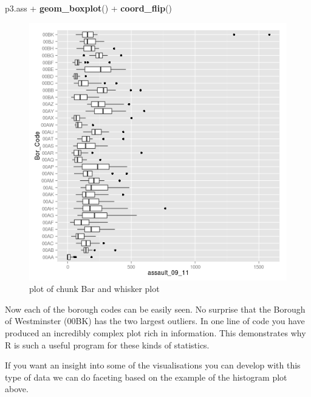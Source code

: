 \documentclass[]{article}
\makeatletter
\newenvironment{Shaded}{}{}
\newcommand{\KeywordTok}[1]{\textcolor[rgb]{0.00,0.44,0.13}{\textbf{{#1}}}}
\newcommand{\NormalTok}[1]{{#1}}
\def\maxwidth{\ifdim\Gin@nat@width>\linewidth\linewidth
\else\Gin@nat@width\fi}
\let\Oldincludegraphics\includegraphics
\renewcommand{\includegraphics}[1]{\Oldincludegraphics[width=\maxwidth]{#1}}
\makeatother
\begin{document}
\begin{Shaded}
\begin{Highlighting}[]
\NormalTok{p3.ass + }\KeywordTok{geom_boxplot}\NormalTok{() + }\KeywordTok{coord_flip}\NormalTok{()}
\end{Highlighting}
\end{Shaded}
\begin{figure}[htbp]
\centering
\includegraphics{figure/Bar_and_whisker_plot.png}
\caption{plot of chunk Bar and whisker plot}
\end{figure}

Now each of the borough codes can be easily seen. No surprise that the
Borough of Westminster (00BK) has the two largest outliers. In one line
of code you have produced an incredibly complex plot rich in
information. This demonstrates why R is such a useful program for these
kinds of statistics.

If you want an insight into some of the visualisations you can develop
with this type of data we can do faceting based on the example of the
histogram plot above.
\end{document}
